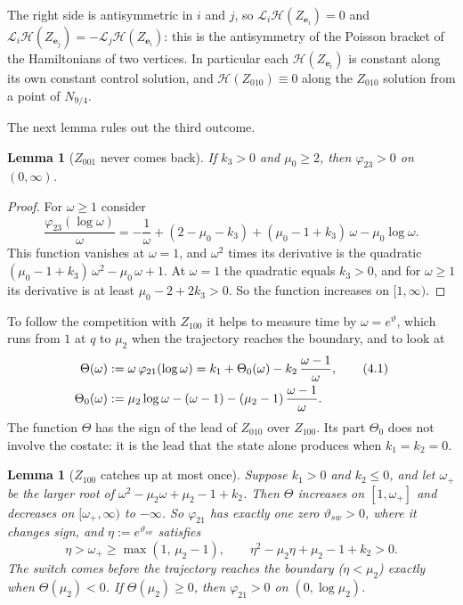 \documentclass[11pt,a4paper]{article}
\theoremstyle{plain}
\newtheorem{lemma}[theorem]{Lemma}
\theoremstyle{definition}
\theoremstyle{remark}
\renewcommand{\H}{\mathcal{H}}
\newcommand{\ep}{\mathbf{e}}
\newcommand{\sw}{_{sw}}
\begin{document}
The right side is antisymmetric in $i$ and $j$, so $\mathcal L_i\H(Z_{\ep_i})=0$ and
$\mathcal L_i\H(Z_{\ep_j})=-\mathcal L_j\H(Z_{\ep_i})$: this is the antisymmetry of the Poisson
bracket of the Hamiltonians of two vertices. In particular each $\H(Z_{\ep_i})$ is constant along
its own constant control solution, and $\H(Z_{010})\equiv0$ along the $Z_{010}$ solution from a
point of $N_{9/4}$.

The next lemma rules out the third outcome.

\begin{lemma}[$Z_{001}$ never comes back]
If $k_3>0$ and $\mu_0\ge2$, then $\varphi_{23}>0$ on $(0,\infty)$.
\end{lemma}

\begin{proof}
For $\omega\ge1$ consider
\[
\frac{\varphi_{23}(\log\omega)}{\omega}=-\frac1\omega+(2-\mu_0-k_3)+(\mu_0-1+k_3)\,\omega-\mu_0\log\omega .
\]
This function vanishes at $\omega=1$, and $\omega^2$ times its derivative is the quadratic
$(\mu_0-1+k_3)\,\omega^2-\mu_0\,\omega+1$. At $\omega=1$ the quadratic equals $k_3>0$, and for
$\omega\ge1$ its derivative is at least $\mu_0-2+2k_3>0$. So the function increases on
$[1,\infty)$.
\end{proof}

To follow the competition with $Z_{100}$ it helps to measure time by $\omega=e^{\vartheta}$, which
runs from $1$ at $q$ to $\mu_2$ when the trajectory reaches the boundary, and to look at
\begin{align}
\Theta(\omega)&:=\omega\,\varphi_{21}(\log\omega)=k_1+\Theta_0(\omega)-k_2\,\frac{\omega-1}{\omega},
\tag{4.1}\\
\Theta_0(\omega)&:=\mu_2\log\omega-(\omega-1)-(\mu_2-1)\,\frac{\omega-1}{\omega}.\notag
\end{align}
The function $\Theta$ has the sign of the lead of $Z_{010}$ over $Z_{100}$. Its part $\Theta_0$
does not involve the costate: it is the lead that the state alone produces when $k_1=k_2=0$.

\begin{lemma}[$Z_{100}$ catches up at most once]
Suppose $k_1>0$ and $k_2\le0$, and let $\omega_+$ be the larger root of
$\omega^2-\mu_2\omega+\mu_2-1+k_2$. Then $\Theta$ increases on $[1,\omega_+]$ and decreases on
$[\omega_+,\infty)$ to $-\infty$. So $\varphi_{21}$ has exactly one zero $\vartheta\sw>0$, where it
changes sign, and $\eta:=e^{\vartheta\sw}$ satisfies
\[
\eta>\omega_+\ge\max(1,\,\mu_2-1),\qquad \eta^2-\mu_2\eta+\mu_2-1+k_2>0 .
\]
The switch comes before the trajectory reaches the boundary ($\eta<\mu_2$) exactly when
$\Theta(\mu_2)<0$. If $\Theta(\mu_2)\ge0$, then $\varphi_{21}>0$ on $(0,\log\mu_2)$.
\end{lemma}
\end{document}
